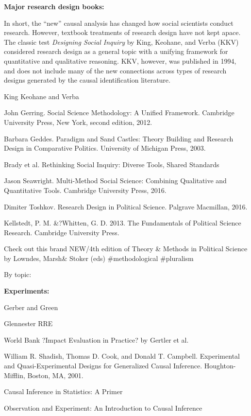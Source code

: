 \documentclass[11pt]{article}
\begin{document}
{\bf Major research design books:}

In short, the ``new'' causal analysis has changed how social scientists conduct research. However, textbook treatments of research design have not kept apace. The classic test \textit{Designing Social Inquiry} by King, Keohane, and Verba (KKV) considered research design as a general topic with a unifying framework for quantitative and qualitative reasoning. KKV, however, was published in 1994, and does not include many of the new connections across types of research designs generated by the causal identification literature.

King Keohane and Verba

John Gerring. Social Science Methodology: A Unified Framework. Cambridge University Press, New York, second edition, 2012.

Barbara Geddes. Paradigm and Sand Castles: Theory Building and Research Design in Comparative Politics. University of Michigan Press, 2003.

Brady et al. Rethinking Social Inquiry: Diverse Tools, Shared Standards

Jason Seawright. Multi-Method Social Science: Combining Qualitative and Quantitative Tools. Cambridge University Press, 2016.

Dimiter Toshkov. Research Design in Political Science. Palgrave Macmillan, 2016.

Kellstedt, P. M. \&?Whitten, G. D. 2013. The Fundamentals of Political Science Research. Cambridge University Press.

Check out this brand NEW/4th edition of Theory & Methods in Political Science by Lowndes, Marsh& Stoker (eds) #methodological #pluralism


\bigskip

By topic:\bigskip

{\bf Experiments:}

Gerber and Green

Glennester RRE

World Bank ?Impact Evaluation in Practice? by Gertler et al.


William R. Shadish, Thomas D. Cook, and Donald T. Campbell. Experimental and Quasi-Experimental Designs for Generalized Causal Inference. Houghton-Mifflin, Boston, MA, 2001.

Causal Inference in Statistics: A Primer

Observation and Experiment: An Introduction to Causal Inference
\end{document}
